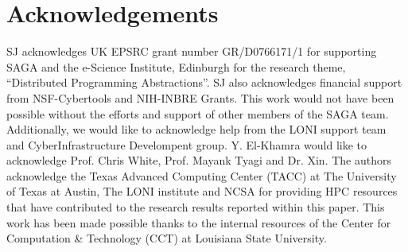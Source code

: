 \documentclass[conference,final]{IEEEtran}
\begin{document}
\section{Acknowledgements}
SJ acknowledges UK EPSRC grant number GR/D0766171/1 for supporting
SAGA and the e-Science Institute, Edinburgh for the research theme,
``Distributed Programming Abstractions''.  SJ also acknowledges
financial support from NSF-Cybertools and NIH-INBRE Grants. This work
would not have been possible without the efforts and support of other
members of the SAGA team.  Additionally, we would like to acknowledge
help from the LONI support team and CyberInfrastructure Develompent
group. Y. El-Khamra would like to acknowledge Prof. Chris White,
Prof. Mayank Tyagi and Dr. Xin. The authors acknowledge the Texas
Advanced Computing Center (TACC) at The University of Texas at Austin,
The LONI institute and NCSA for providing HPC resources that have
contributed to the research results reported within this paper. This
work has been made possible thanks to the internal resources of the
Center for Computation \& Technology (CCT) at Louisiana State
University.  

 

\end{document}
